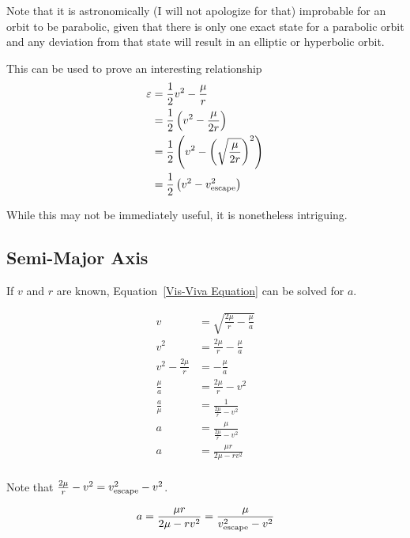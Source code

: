 \documentclass[../basicOrbitalDynamics.tex]{subfiles}
\begin{document}
Note that it is astronomically (I will not apologize for that) improbable for an orbit to be parabolic, given that there is only one exact state for a parabolic orbit and any deviation from that state will result in an elliptic or hyperbolic orbit.

This can be used to prove an interesting relationship
\begin{align*}
    \varepsilon & = \frac{1}{2}v^2-\frac{\mu}{r}                                     \\
                & = \frac{1}{2}\left(v^2-\frac{\mu}{2r}\right)                       \\
                & = \frac{1}{2}\left(v^2-\left(\sqrt{\frac{\mu}{2r}}\right)^2\right) \\
                & = \frac{1}{2}\left(v^2-{v}_\text{escape}^2\right)                    \\
\end{align*}

While this may not be immediately useful, it is nonetheless intriguing.

\bigskip\bigskip
\subsection{Semi-Major Axis}\label{sec:SMA in Terms of V,R}

If $v$ and $r$ are known, Equation~\eqref{Vis-Viva Equation} can be solved for $a$.

\begin{align*}
    v                  & = \sqrt{\frac{2\mu}{r}-\frac{\mu}{a}} \\
    v^2                & = \frac{2\mu}{r}-\frac{\mu}{a}        \\
    v^2-\frac{2\mu}{r} & =-\frac{\mu}{a}                       \\
    \frac{\mu}{a}      & = \frac{2\mu}{r}-v^2                  \\
    \frac{a}{\mu}      & = \frac{1}{\frac{2\mu}{r}-v^2}        \\
    a                  & = \frac{\mu}{\frac{2\mu}{r}-v^2}      \\
    a                  & = \frac{\mu r}{2\mu-rv^2}             \\
\end{align*}

Note that $\frac{2\mu}{r}-v^2={v}_\text{escape}^2-v^2$.

\begin{equation}\label{SMA in terms of r, v}
    a=\frac{\mu r}{2\mu-rv^2}=\frac{\mu}{{v}_\text{escape}^2-v^2}
\end{equation}
\end{document}
